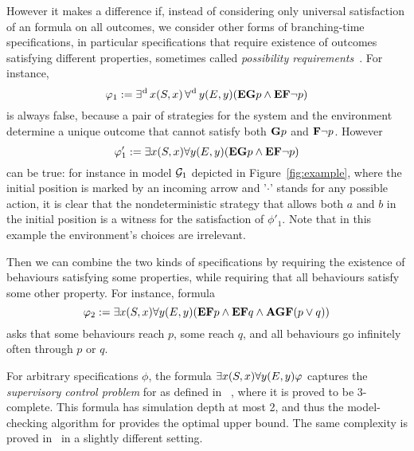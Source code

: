 However it makes a difference if, instead of considering only
universal satisfaction of an \LTL formula on all outcomes, we consider
other forms of branching-time specifications, in particular
specifications that require existence of outcomes satisfying different
properties, sometimes called \emph{possibility requirements}~\cite{kupferman1997module}. For instance,
\[\varphi_1:=\operatorname*{\exists^{\hskip.5pt\text{d}}} x (S,x) \operatorname*{\forall^{\hskip.5pt\text{d}}} y (E,y) ({\bf E} {\bf G} p
  \wedge {\bf E} {\bf F} \neg p)\]
is always false, because a pair of
strategies for the system and the environment determine a unique
outcome that cannot satisfy both ${\bf G} p$ and ${\bf F}\neg p$.
However
\[\varphi'_1:=\exists x (S,x) \forall y (E,y) ({\bf E} {\bf G} p
  \wedge {\bf E} {\bf F} \neg p)\]
 can be true: for instance in model $\CGS_1$ depicted in Figure~\ref{fig:example}, where the
initial position is marked by an incoming arrow and  '$\cdot$' stands
for any possible action, it is clear that the nondeterministic
strategy that allows both $a$ and $b$ in the initial position is a
witness for the satisfaction of $\phi'_1$.
Note that in this example the environment's choices are irrelevant.

Then we can combine the two kinds of specifications by  requiring the
existence of behaviours satisfying some properties, while requiring
that all  behaviours satisfy some other property.
For instance, formula
\[\varphi_2:=\exists x (S,x) \forall y (E,y)({\bf E} {\bf F} p \wedge {\bf E} {\bf F}
  q \wedge {\bf A} {\bf G} {\bf F} (p\vee q))\]
  asks that some behaviours 
 reach $p$, some  reach $q$, and all behaviours go infinitely
 often through $p$ or $q$.

For arbitrary \CTLs specifications $\phi$, the formula $\exists x
(S,x) \forall y (E,y)\varphi$ captures the
\emph{supervisory control problem} for \CTLs as defined in
~\cite{KMTV00}, where it is proved to be 3\EXPTIME-complete.
This formula has simulation depth at most 2,
  and thus the model-checking algorithm for \SLref provides the
  optimal upper bound. The same complexity is proved
  in~\cite{jiang2006supervisory} in a slightly different setting.

  
